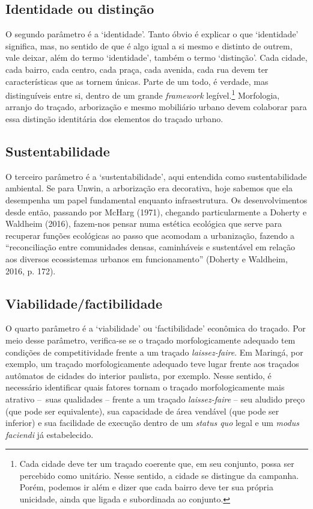 \documentclass[12pt, a4paper]{book} %
\begin{document}
                \subsection*{Identidade ou distinção}
        
        O segundo parâmetro é a `identidade'. Tanto óbvio é explicar o que `identidade' significa, mas, no sentido de que é algo igual a si mesmo e distinto de outrem, vale deixar, além do termo `identidade', também o termo `distinção'. Cada cidade, cada bairro, cada centro, cada praça, cada avenida, cada rua devem ter características que as tornem únicas. Parte de um todo, é verdade, mas distinguíveis entre si, dentro de um grande \textit{framework} legível.\footnote[28]{Cada cidade deve ter um traçado coerente que, em seu conjunto, possa ser percebido como unitário. Nesse sentido, a cidade se distingue da campanha. Porém, podemos ir além e dizer que cada bairro deve ter sua própria unicidade, ainda que ligada e subordinada ao conjunto.} Morfologia, arranjo do traçado, arborização e mesmo mobiliário urbano devem colaborar para essa distinção identitária dos elementos do traçado urbano.

                \subsection*{Sustentabilidade}

        O terceiro parâmetro é a `sustentabilidade', aqui entendida como sustentabilidade ambiental. Se para Unwin, a arborização era decorativa, hoje sabemos que ela desempenha um papel fundamental enquanto infraestrutura. Os desenvolvimentos desde então, passando por McHarg (1971), chegando particularmente a Doherty e Waldheim (2016), fazem-nos pensar numa estética ecológica que serve para recuperar funções ecológicas ao passo que acomodam a urbanização, fazendo a ``reconciliação entre comunidades densas, caminháveis e sustentável em relação aos diversos ecossistemas urbanos em funcionamento'' (Doherty e Waldheim, 2016, p. 172).

                \subsection*{Viabilidade/factibilidade}

        O quarto parâmetro é a `viabilidade' ou `factibilidade' econômica do traçado. Por meio desse parâmetro, verifica-se se o traçado morfologicamente adequado tem condições de competitividade frente a um traçado \textit{laissez-faire}. Em Maringá, por exemplo, um traçado morfologicamente adequado teve lugar frente aos traçados autômatos de cidades do interior paulista, por exemplo. Nesse sentido, é necessário identificar quais fatores tornam o traçado morfologicamente mais atrativo – suas qualidades – frente a um traçado \textit{laissez-faire} – seu aludido preço (que pode ser equivalente), sua capacidade de área vendável (que pode ser inferior) e sua facilidade de execução dentro de um \textit{status quo} legal e um \textit{modus faciendi} já estabelecido.
\end{document}
